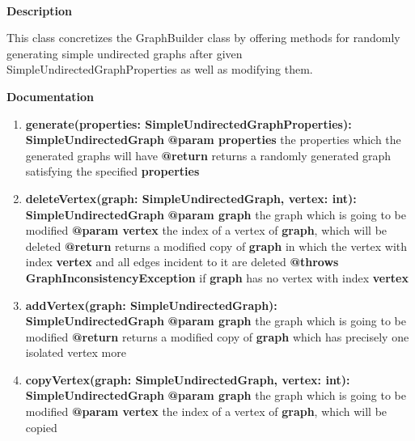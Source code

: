 	~\newline
	~\newline
	~\newline
	
	
	\textbf{Description}
	
	This class concretizes the GraphBuilder class by offering methods for randomly generating simple undirected graphs after given SimpleUndirectedGraphProperties as well as modifying them.
	
	\textbf{Documentation}
	\begin{enumerate}[+]
		\item{
			\textbf{generate(properties: SimpleUndirectedGraphProperties): SimpleUndirectedGraph} \newline
			\textbf{@param properties} the properties which the generated graphs will have \newline
			\textbf{@return} returns a randomly generated graph satisfying the specified \textbf{properties}
		}
		\item{
			\textbf{deleteVertex(graph: SimpleUndirectedGraph, vertex: int): SimpleUndirectedGraph} \newline
			\textbf{@param graph} the graph which is going to be modified \newline
			\textbf{@param vertex} the index of a vertex of \textbf{graph}, which will be deleted \newline
			\textbf{@return} returns a modified copy of \textbf{graph} in which the vertex with index \textbf{vertex} and all edges incident to it are deleted \newline
			\textbf{@throws GraphInconsistencyException} if \textbf{graph} has no vertex with index \textbf{vertex} 
		}
		\item{
			\textbf{addVertex(graph: SimpleUndirectedGraph): SimpleUndirectedGraph} \newline
			\textbf{@param graph} the graph which is going to be modified \newline
			\textbf{@return} returns a modified copy of \textbf{graph} which has precisely one isolated vertex more
		}
		\item{
			\textbf{copyVertex(graph: SimpleUndirectedGraph, vertex: int): SimpleUndirectedGraph} \newline
			\textbf{@param graph} the graph which is going to be modified \newline
			\textbf{@param vertex} the index of a vertex of \textbf{graph}, which will be copied \newline
}
\end{enumerate}
